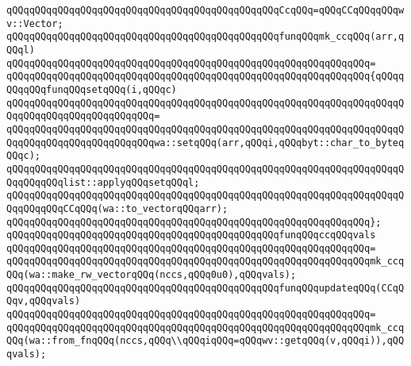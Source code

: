 \verb|qQQqqQQqqQQqqQQqqQQqqQQqqQQqqQQqqQQqqQQqqQQqqQQqCcqQQq=qQQqCCqQQqqQQqwv::Vector;|\newline
\newline
\verb|qQQqqQQqqQQqqQQqqQQqqQQqqQQqqQQqqQQqqQQqqQQqqQQqfunqQQqmk_ccqQQq(arr,qQQql)|\newline
\verb|qQQqqQQqqQQqqQQqqQQqqQQqqQQqqQQqqQQqqQQqqQQqqQQqqQQqqQQqqQQqqQQq=|\newline
\verb|qQQqqQQqqQQqqQQqqQQqqQQqqQQqqQQqqQQqqQQqqQQqqQQqqQQqqQQqqQQqqQQq{qQQqqQQqqQQqfunqQQqsetqQQq(i,qQQqc)|\newline
\verb|qQQqqQQqqQQqqQQqqQQqqQQqqQQqqQQqqQQqqQQqqQQqqQQqqQQqqQQqqQQqqQQqqQQqqQQqqQQqqQQqqQQqqQQqqQQqqQQq=|\newline
\verb|qQQqqQQqqQQqqQQqqQQqqQQqqQQqqQQqqQQqqQQqqQQqqQQqqQQqqQQqqQQqqQQqqQQqqQQqqQQqqQQqqQQqqQQqqQQqqQQqwa::setqQQq(arr,qQQqi,qQQqbyt::char_to_byteqQQqc);|\newline
\newline
\verb|qQQqqQQqqQQqqQQqqQQqqQQqqQQqqQQqqQQqqQQqqQQqqQQqqQQqqQQqqQQqqQQqqQQqqQQqqQQqqQQqlist::applyqQQqsetqQQql;|\newline
\verb|qQQqqQQqqQQqqQQqqQQqqQQqqQQqqQQqqQQqqQQqqQQqqQQqqQQqqQQqqQQqqQQqqQQqqQQqqQQqqQQqCCqQQq(wa::to_vectorqQQqarr);|\newline
\verb|qQQqqQQqqQQqqQQqqQQqqQQqqQQqqQQqqQQqqQQqqQQqqQQqqQQqqQQqqQQqqQQq};|\newline
\newline
\newline
\verb|qQQqqQQqqQQqqQQqqQQqqQQqqQQqqQQqqQQqqQQqqQQqqQQqfunqQQqccqQQqvals|\newline
\verb|qQQqqQQqqQQqqQQqqQQqqQQqqQQqqQQqqQQqqQQqqQQqqQQqqQQqqQQqqQQqqQQq=|\newline
\verb|qQQqqQQqqQQqqQQqqQQqqQQqqQQqqQQqqQQqqQQqqQQqqQQqqQQqqQQqqQQqqQQqmk_ccqQQq(wa::make_rw_vectorqQQq(nccs,qQQq0u0),qQQqvals);|\newline
\newline
\newline
\verb|qQQqqQQqqQQqqQQqqQQqqQQqqQQqqQQqqQQqqQQqqQQqqQQqfunqQQqupdateqQQq(CCqQQqv,qQQqvals)|\newline
\verb|qQQqqQQqqQQqqQQqqQQqqQQqqQQqqQQqqQQqqQQqqQQqqQQqqQQqqQQqqQQqqQQq=|\newline
\verb|qQQqqQQqqQQqqQQqqQQqqQQqqQQqqQQqqQQqqQQqqQQqqQQqqQQqqQQqqQQqqQQqmk_ccqQQq(wa::from_fnqQQq(nccs,qQQq\\qQQqiqQQq=qQQqwv::getqQQq(v,qQQqi)),qQQqvals);|\newline
\newline
